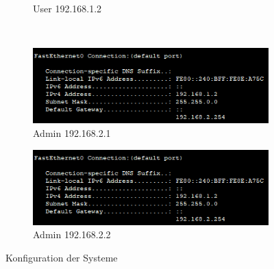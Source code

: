 \begin{figure}[!htb]
\begin{subfigure}{.45\textwidth}
        \caption{User 192.168.1.2}
    \end{subfigure}
    ~
    \begin{subfigure}{.45\textwidth}
        \includegraphics[width=\textwidth,height=\textwidth,keepaspectratio]{./img/test1/admin1.png}
        \caption{Admin 192.168.2.1}
    \end{subfigure}
    \begin{subfigure}{.45\textwidth}
        \includegraphics[width=\textwidth,height=\textwidth,keepaspectratio]{./img/test1/admin1.png}
        \caption{Admin 192.168.2.2}
    \end{subfigure}
    \caption{Konfiguration der Systeme}
\end{figure}
\FloatBarrier
